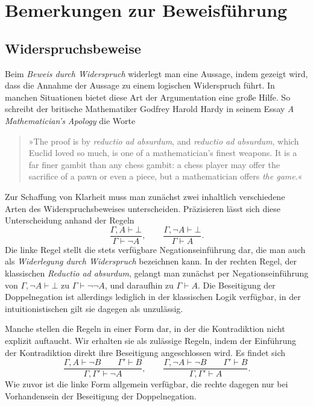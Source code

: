 
\section{Bemerkungen zur Beweisführung}

\subsection{Widerspruchsbeweise}

Beim \emph{Beweis durch Widerspruch} widerlegt man eine Aussage, indem
gezeigt wird, dass die Annahme der Aussage zu einem logischen
Widerspruch führt. In manchen Situationen bietet diese Art der
Argumentation eine große Hilfe. So schreibt der britische Mathematiker
Godfrey Harold Hardy in seinem Essay \emph{A Mathematician's Apology}
die Worte
\begin{quote}
»The proof is by \emph{reductio ad absurdum}, and \emph{reductio ad
absurdum}, which Euclid loved so much, is one of a mathematician's
finest weapons. It is a far finer gambit than any chess gambit: a chess
player may offer the sacrifice of a pawn or even a piece, but a
mathematician offers \emph{the game}.«
\end{quote}
Zur Schaffung von Klarheit muss man zunächst zwei inhaltlich
verschiedene Arten des Widerspruchsbeweises unterscheiden.
Präzisieren lässt sich diese Unterscheidung anhand
der Regeln
\[\dfrac{\Gamma,A\vdash\bot}{\Gamma\vdash\lnot A},\qquad
\dfrac{\Gamma,\lnot A\vdash\bot}{\Gamma\vdash A}.\]
Die linke Regel stellt die stets verfügbare Negationseinführung dar,
die man auch als \emph{Widerlegung durch Widerspruch} bezeichnen kann.
In der rechten Regel, der klassischen \emph{Reductio ad absurdum},
gelangt man zunächst per Negationseinführung von
$\Gamma,\lnot A\vdash\bot$ zu $\Gamma\vdash\lnot\lnot A$, und daraufhin
zu $\Gamma\vdash A$. Die Beseitigung der Doppelnegation ist allerdings
lediglich in der klassischen Logik verfügbar, in der intuitionistischen
gilt sie dagegen als unzulässig.

Manche stellen die Regeln in einer Form dar, in der die Kontradiktion
nicht explizit auftaucht. Wir erhalten sie als zulässige Regeln, indem
der Einführung der Kontradiktion direkt ihre Beseitigung
angeschlossen wird. Es findet sich
\[\dfrac{\Gamma,A\vdash\lnot B\qquad\Gamma'\vdash B}
{\Gamma,\Gamma'\vdash\lnot A},\qquad
\dfrac{\Gamma,\lnot A\vdash\lnot B\qquad\Gamma'\vdash B}
{\Gamma,\Gamma'\vdash A}.\]
Wie zuvor ist die linke Form allgemein verfügbar, die rechte dagegen
nur bei Vorhandensein der Beseitigung der Doppelnegation.

